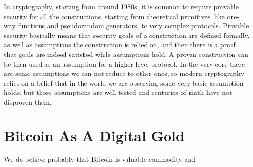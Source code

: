 \documentclass{article}   %
\begin{document}
In cryptography, starting from around 1980s, it is common to require provable security for all the constructions, starting from theoretical primitives, like one-way functions and pseudorandom generators, to very complex protocols. Provable security basically means that security goals of a construction are defined formally, as well as assumptions the construction is relied on, and then 
there is a proof that goals are indeed satisfied while assumptions hold. A proven construction can be then used as an assumption for a higher level protocol. In the very core there are some assumptions we can not reduce to other ones, so modern cryptography relies on a belief that in the world we are observing some very basic assumption holds, but those assumptions are well tested and centuries of math have not disproven them. 

\section{Bitcoin As A Digital Gold}

We do believe probably that Bitcoin is valuable commodity and 
\end{document}
